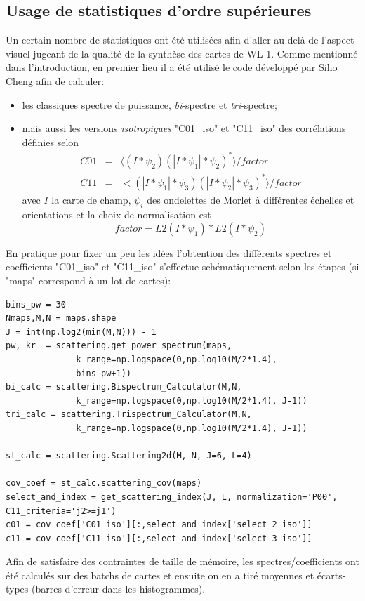 \documentclass[12pt,twoside]{article}
\newcommand{\itemb}{\item[$\bullet$]}
\begin{document}
\subsection{Usage de statistiques d'ordre supérieures}
%
Un certain nombre de statistiques ont été utilisées afin d'aller au-delà de l'aspect visuel jugeant de la qualité de la synthèse des cartes de WL-1. Comme mentionné dans l'introduction, en premier lieu il a été utilisé le code développé par Siho Cheng afin de calculer:
\begin{itemize}
\itemb les classiques spectre de puissance, \textit{bi}-spectre et \textit{tri}-spectre; 
\itemb mais aussi les versions \textit{isotropiques} "C01\_iso" et "C11\_iso" des corrélations définies selon
\begin{eqnarray}
 C01 &=& \langle(I \ast \psi_2)(|I \ast \psi_1| \ast \psi_2)^\ast\rangle / factor \\
 C11 &=& <(|I \ast \psi_1| * \psi_3)(|I * \psi_2| * \psi_3)^\ast\rangle / factor
\end{eqnarray}
avec $I$ la carte de champ, $\psi_i$ des ondelettes de Morlet à différentes échelles et orientations et la choix de normalisation est 
\begin{equation}
factor = L2(I \ast \psi_1) * L2(I \ast \psi_2)
\end{equation}
\end{itemize}
En pratique pour fixer un peu les idées l'obtention des différents spectres et coefficients "C01\_iso" et "C11\_iso" s'effectue schématiquement selon les étapes (si "maps" correspond à un lot de cartes):
\begin{lstlisting}[language=iPython]
bins_pw = 30
Nmaps,M,N = maps.shape
J = int(np.log2(min(M,N))) - 1
pw, kr  = scattering.get_power_spectrum(maps,
              k_range=np.logspace(0,np.log10(M/2*1.4), 
              bins_pw+1))
bi_calc = scattering.Bispectrum_Calculator(M,N, 
              k_range=np.logspace(0,np.log10(M/2*1.4), J-1))
tri_calc = scattering.Trispectrum_Calculator(M,N,
              k_range=np.logspace(0,np.log10(M/2*1.4), J-1))

st_calc = scattering.Scattering2d(M, N, J=6, L=4)

cov_coef = st_calc.scattering_cov(maps)
select_and_index = get_scattering_index(J, L, normalization='P00', C11_criteria='j2>=j1')
c01 = cov_coef['C01_iso'][:,select_and_index['select_2_iso']]
c11 = cov_coef['C11_iso'][:,select_and_index['select_3_iso']]
\end{lstlisting}
Afin de satisfaire des contraintes de taille de mémoire, les spectres/coefficients ont été calculés sur des batchs de cartes et ensuite on en a tiré moyennes et écarts-types (barres d'erreur dans les histogrammes).
\end{document}
